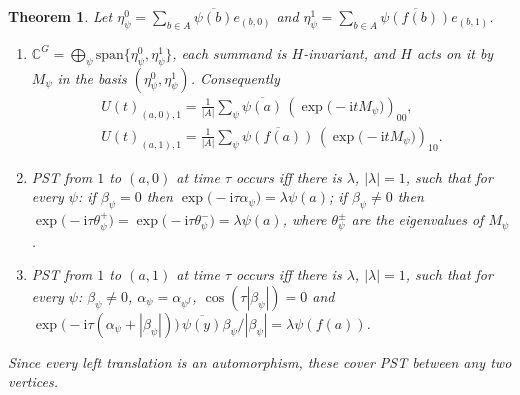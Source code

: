 \documentclass[preprint,11pt]{elsarticle}
\newtheorem{theorem}{Theorem}[section]
\theoremstyle{definition}
\theoremstyle{remark}
\newcommand{\ii}{\mathrm i}
\begin{document}
\begin{theorem}\label{thm:N}
Let $\eta^0_\psi=\sum_{b\in A}\overline{\psi(b)}e_{(b,0)}$ and $\eta^1_\psi=\sum_{b\in A}\overline{\psi(f(b))}e_{(b,1)}$.
\begin{enumerate}
\item[(a)] $\mathbb C^G=\bigoplus_\psi\mathrm{span}\{\eta^0_\psi,\eta^1_\psi\}$, each summand is $H$-invariant, and $H$ acts on it by $M_\psi$ in the basis $(\eta^0_\psi,\eta^1_\psi)$. Consequently
\begin{gather*}
U(t)_{(a,0),1}=\tfrac1{|A|}\sum_\psi\overline{\psi(a)}\,(\exp\bigl(-\ii tM_\psi\bigr))_{00},\\
U(t)_{(a,1),1}=\tfrac1{|A|}\sum_\psi\overline{\psi(f(a))}\,(\exp\bigl(-\ii tM_\psi\bigr))_{10}.
\end{gather*}
\item[(b)] PST from $1$ to $(a,0)$ at time $\tau$ occurs iff there is $\lambda$, $|\lambda|=1$, such that for every $\psi$: if $\beta_\psi=0$ then $\exp\bigl(-\ii\tau\alpha_\psi\bigr)=\lambda\psi(a)$; if $\beta_\psi\neq0$ then $\exp\bigl(-\ii\tau\theta^+_\psi\bigr)=\exp\bigl(-\ii\tau\theta^-_\psi\bigr)=\lambda\psi(a)$, where $\theta^\pm_\psi$ are the eigenvalues of $M_\psi$.
\item[(c)] PST from $1$ to $(a,1)$ at time $\tau$ occurs iff there is $\lambda$, $|\lambda|=1$, such that for every $\psi$: $\beta_\psi\ne0$, $\alpha_\psi=\alpha_{\psi^f}$, $\cos(\tau|\beta_\psi|)=0$ and $\exp\bigl(-\ii\tau(\alpha_\psi+|\beta_\psi|)\bigr)\,\overline{\psi(y)}\beta_\psi/|\beta_\psi|=\lambda\psi(f(a))$.
\end{enumerate}
Since every left translation is an automorphism, these cover PST between any two vertices.
\end{theorem}
\end{document}
